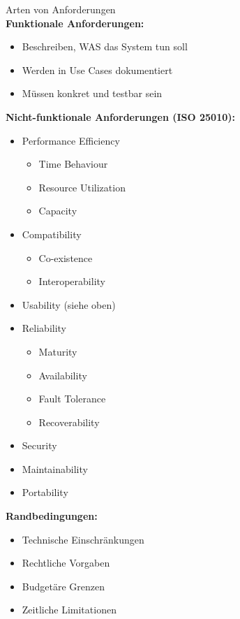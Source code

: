 \begin{concept}{Arten von Anforderungen}\\
\textbf{Funktionale Anforderungen:}
\begin{itemize}
    \item Beschreiben, WAS das System tun soll
    \item Werden in Use Cases dokumentiert
    \item Müssen konkret und testbar sein
\end{itemize}

\textbf{Nicht-funktionale Anforderungen (ISO 25010):}
\begin{itemize}
    \item Performance Efficiency
    \begin{itemize}
        \item Time Behaviour
        \item Resource Utilization
        \item Capacity
    \end{itemize}
    \item Compatibility
    \begin{itemize}
        \item Co-existence
        \item Interoperability
    \end{itemize}
    \item Usability (siehe oben)
    \item Reliability
    \begin{itemize}
        \item Maturity
        \item Availability
        \item Fault Tolerance
        \item Recoverability
    \end{itemize}
    \item Security
    \item Maintainability
    \item Portability
\end{itemize}

\textbf{Randbedingungen:}
\begin{itemize}
    \item Technische Einschränkungen
    \item Rechtliche Vorgaben
    \item Budgetäre Grenzen
    \item Zeitliche Limitationen
\end{itemize}
\end{concept}

